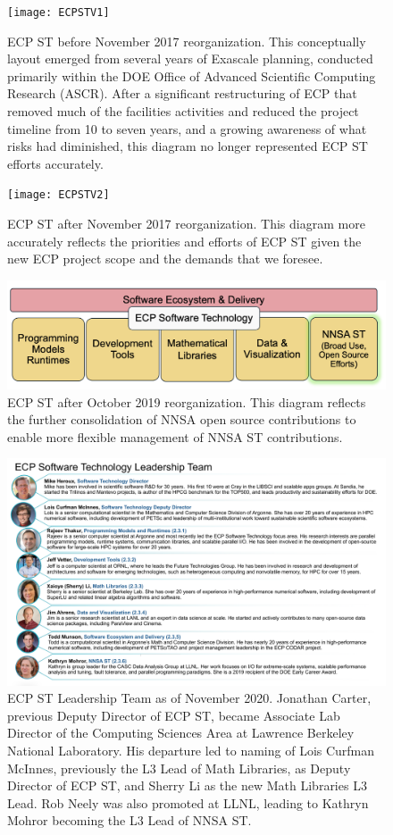 \begin{figure}
	\centering
	\texttt{[image: ECPSTV1]}
	\caption{ECP ST before November 2017 reorganization.  This conceptually layout emerged from several years of Exascale planning, conducted primarily within the DOE Office of Advanced Scientific Computing Research (ASCR).  After a significant restructuring of ECP that removed much of the facilities activities and reduced the project timeline from 10 to seven years, and a growing awareness of what risks had diminished, this diagram no longer represented ECP ST efforts accurately.}
	\label{fig:ecpstv1}
\end{figure}
\begin{figure}
	\centering
	\texttt{[image: ECPSTV2]}
	\caption{ECP ST after November 2017 reorganization.  This diagram more accurately reflects the priorities and efforts of ECP ST given the new ECP project scope and the demands that we foresee.}
	\label{fig:ecpstv2}
\end{figure}
\begin{figure}
	\centering
	\includegraphics[width=0.9\linewidth]{ECPSTV3}
	\caption{ECP ST after October 2019 reorganization.  This diagram reflects the further consolidation of NNSA open source contributions to enable more flexible management of NNSA ST contributions.}
\end{figure}
\begin{figure}
	\centering
	\includegraphics[width=0.9\linewidth]{ECP-ST-Leads}
	\caption{ECP ST Leadership Team as of November 2020. Jonathan Carter, previous Deputy Director of ECP ST, became Associate Lab Director of the Computing Sciences Area at Lawrence Berkeley National Laboratory. His departure led to naming of Lois Curfman McInnes, previously the L3 Lead of Math Libraries, as Deputy Director of ECP ST, and Sherry Li as the new Math Libraries L3 Lead.  Rob Neely was also promoted at LLNL, leading to Kathryn Mohror becoming the L3 Lead of NNSA ST.}
	\label{fig:ecpstleads}
\end{figure}

